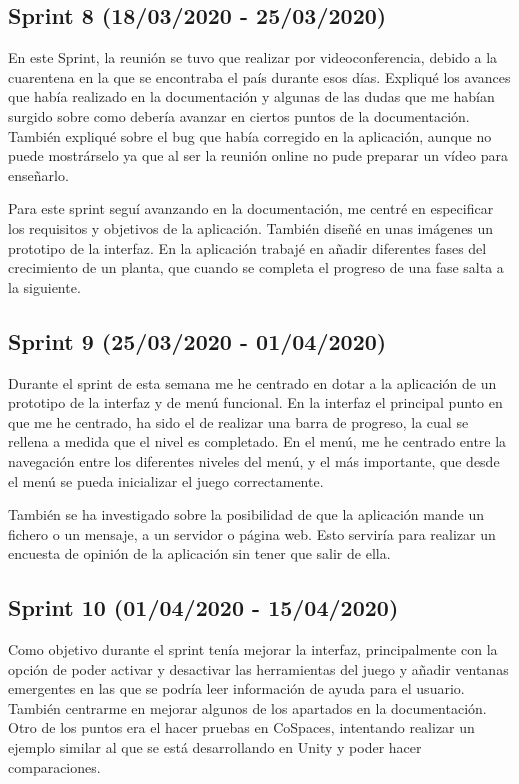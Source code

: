 \subsection{Sprint 8 (18/03/2020 - 25/03/2020)}
En este Sprint, la reunión se tuvo que realizar por videoconferencia, debido a la cuarentena en la que se encontraba el país durante esos días. Expliqué los avances que había realizado en la documentación y algunas de las dudas que me habían surgido sobre como debería avanzar en ciertos puntos de la documentación. También expliqué sobre el bug que había corregido en la aplicación, aunque no puede mostrárselo ya que al ser la reunión online  no pude preparar un vídeo para enseñarlo.
 
Para este sprint seguí avanzando en la documentación, me centré en especificar los requisitos y objetivos de la aplicación. También diseñé en unas imágenes un prototipo de la interfaz. En la aplicación trabajé en añadir diferentes fases del crecimiento de un planta, que cuando se completa el progreso de una fase salta a la siguiente. 
\subsection{Sprint 9 (25/03/2020 - 01/04/2020)}
Durante el sprint de esta semana me he centrado en dotar a la aplicación de un prototipo de la interfaz y de menú funcional. En la interfaz el principal punto en que me he centrado, ha sido el de realizar una barra de progreso, la cual se rellena a medida que el nivel es completado. En el menú, me he centrado entre la navegación entre los diferentes niveles del menú, y el más importante, que desde el menú se pueda inicializar el juego correctamente.

También se ha investigado sobre la posibilidad de que la aplicación mande un fichero o un mensaje, a un servidor o página web. Esto serviría para realizar un encuesta de opinión de la aplicación sin tener que salir de ella. 
\subsection{Sprint 10 (01/04/2020 - 15/04/2020)}
Como objetivo durante el sprint tenía mejorar la interfaz, principalmente con la opción de poder activar y desactivar las herramientas del juego y añadir ventanas emergentes en las que se podría leer información de ayuda para el usuario. También centrarme en mejorar algunos de los apartados en la documentación.
Otro de los puntos era el hacer pruebas en CoSpaces, intentando realizar un ejemplo similar al que se está desarrollando en Unity y poder hacer comparaciones.
